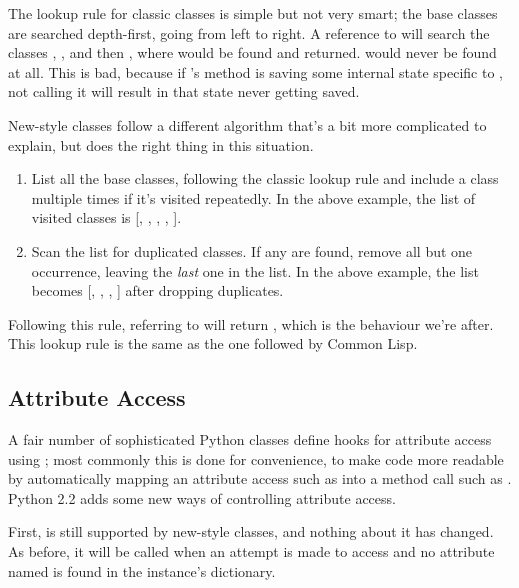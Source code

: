 \documentclass{howto}
\begin{document}
The lookup rule for classic classes is simple but not very smart; the
base classes are searched depth-first, going from left to right.  A
reference to  will search the classes ,
, and then , where  would be found
and returned.   would never be found at all.  This is
bad, because if 's  method is saving some
internal state specific to , not calling it will result in
that state never getting saved.

New-style classes follow a different algorithm that's a bit more
complicated to explain, but does the right thing in this situation.

\begin{enumerate}

\item List all the base classes, following the classic lookup rule and
include a class multiple times if it's visited repeatedly.  In the
above example, the list of visited classes is [, ,
, , ].

\item Scan the list for duplicated classes.  If any are found, remove
all but one occurrence, leaving the \emph{last} one in the list.  In
the above example, the list becomes [, , ,
] after dropping duplicates.

\end{enumerate}

Following this rule, referring to  will return
, which is the behaviour we're after.  This lookup
rule is the same as the one followed by Common Lisp.  



\subsection{Attribute Access}

A fair number of sophisticated Python classes define hooks for
attribute access using ; most commonly this is
done for convenience, to make code more readable by automatically
mapping an attribute access such as  into a method
call such as .  Python 2.2 adds some new ways
of controlling attribute access.

First,  is still supported by
new-style classes, and nothing about it has changed.  As before, it
will be called when an attempt is made to access  and no
attribute named  is found in the instance's dictionary.
\end{document}
